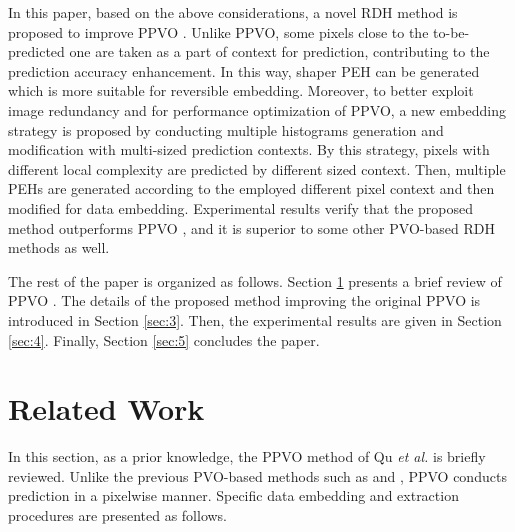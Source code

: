 \documentclass[review,3p,10pt,sort&compress]{elsarticle}
\begin{document}
In this paper, based on the above considerations, a novel RDH method is proposed to improve PPVO \cite{Qu2015PPVO}. Unlike PPVO, some pixels close to the to-be-predicted one are taken as a part of context for prediction, contributing to the prediction accuracy enhancement. In this way, shaper PEH can be generated which is more suitable for reversible embedding. Moreover, to better exploit image redundancy and for performance optimization of PPVO, a new embedding strategy is proposed by conducting multiple histograms generation and modification with multi-sized prediction contexts. By this strategy, pixels with different local complexity are predicted by different sized context. Then, multiple PEHs are generated according to the employed different pixel context and then modified for data embedding. Experimental results verify that the proposed method outperforms PPVO \cite{Qu2015PPVO}, and it is superior to some other PVO-based RDH methods \cite{Peng2014IPVO,Ou2014PVOk} as well.


The rest of the paper is organized as follows. Section \ref{sec:2} presents a brief review of PPVO \cite{Qu2015PPVO}. The details of the proposed method improving the original PPVO is introduced in Section \ref{sec:3}. Then, the experimental results are given in Section \ref{sec:4}. Finally, Section \ref{sec:5} concludes the paper.

\section{Related Work}\label{sec:2}

In this section, as a prior knowledge, the PPVO method of Qu \emph{et al.} \cite{Qu2015PPVO} is briefly reviewed. Unlike the previous PVO-based methods such as \cite{Li2013PVO} and \cite{Peng2014IPVO}, PPVO conducts prediction in a pixelwise manner. Specific data embedding and extraction procedures are presented as follows.
\end{document}
